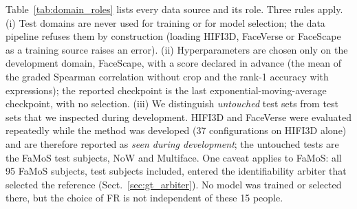 Table~\ref{tab:domain_roles} lists every data source and its role. Three rules
apply. (i) Test domains are never used for training or for model selection;
the data pipeline refuses them by construction (loading HIFI3D, FaceVerse or
FaceScape as a training source raises an error).
(ii) Hyperparameters are chosen only on the development domain, FaceScape,
with a score declared in advance (the mean of the graded Spearman correlation
without crop and the rank-1 accuracy with expressions); the reported
checkpoint is the last exponential-moving-average checkpoint, with no
selection.
(iii) We distinguish \emph{untouched} test sets from test sets that we
inspected during development. HIFI3D and FaceVerse were evaluated repeatedly
while the method was developed (37 configurations on HIFI3D alone) and are
therefore reported as \emph{seen during development}; the untouched tests are
the FaMoS test subjects, NoW and Multiface.
One caveat applies to FaMoS: all 95 FaMoS subjects, test subjects included,
entered the identifiability arbiter that selected the reference
(Sect.~\ref{sec:gt_arbiter}). No model was trained or selected there, but the
choice of FR is not independent of these 15 people.

